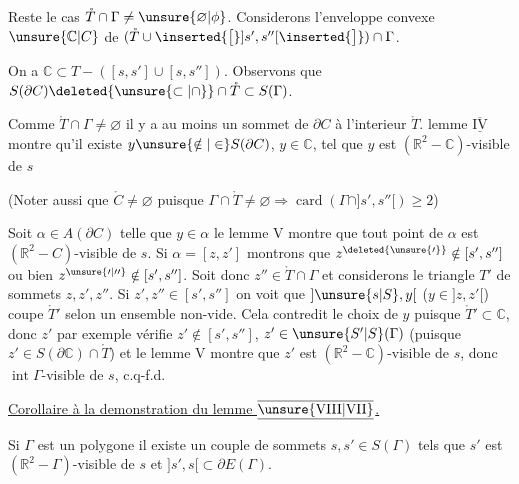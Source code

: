 \margin{!!}Reste le cas $\mathring{T}\cap\Gamma\ne\unsure{\varnothing|\phi}$. Considerons l'enveloppe convexe $\unsure{\mathbb{C}|C}$ de $(\mathring{T}\cup\inserted{\bigl[}]s',s''[\inserted{\bigr]})\cap\Gamma$.

On a $\mathbb{C}\subset T-([s,s']\cup[s,s''])$. Observons que $S(\partial C)\deleted{\unsure{\subset|\cap}}\cap\mathring{T}\subset S(\Gamma)$.

Comme $\mathring{T}\cap\Gamma\ne\varnothing$ il y a au moins un sommet de $\partial C$ à l'interieur $\mathring{T}$.  lemme $\underline{\overline{\mathrm{IV}}}$ montre qu'il existe $y\unsure{\notin|\in}S(\partial C)$, $y\in\mathbb{C}$, tel que $y$ est $(\mathbb{R}^2-\mathbb{C})$-visible de $s$

(Noter aussi que $\mathring{C}\ne\varnothing$ puisque $\Gamma\cap\mathring{T}\ne\varnothing\Rightarrow\operatorname{card}(\Gamma\cap]s',s''[)\geq 2$)

Soit $\alpha\in A(\partial C)$ telle que $y\in\alpha$ le lemme V montre que tout point de $\alpha$ est $(\mathbb{R}^2-C)$-visible de $s$. Si $\alpha=[z,z']$ montrons que $z^{\deleted{\unsure{\prime}}}\notin[s',s'']$ ou bien $z^{\unsure{\prime|\prime\prime}}\notin[s',s'']$. Soit donc $z''\in\mathring{T}\cap\Gamma$ et considerons le triangle $T'$ de sommets $z,z',z''$. Si $z',z''\in[s',s'']$ on voit que $]\unsure{s|S},y[$ ($y\in]z,z'[$) coupe $\mathring{T}'$ selon un ensemble non-vide. Cela contredit le choix de $y$ puisque $\mathring{T}'\subset\mathbb{C}$,  donc $z'$ par exemple vérifie $z'\notin[s',s'']$, $z'\in\unsure{S'|S}(\Gamma)$ (puisque $z'\in S(\partial\mathbb{C})\cap\mathring{T}$) et le lemme  V montre que $z'$ est $(\mathbb{R}^2-\mathbb{C})$-visible de $s$, donc $\operatorname{int}\Gamma$-visible de $s$, c.q-f.d.

\uline{Corollaire à la demonstration du lemme $\underline{\overline{\mathrm{\unsure{VIII|VII}}}}$.} \margin{!!}

Si $\Gamma$ est un polygone il existe un couple de sommets  $s,s'\in S(\Gamma)$ tels que $s'$ est  $(\mathbb{R}^2-\Gamma)$-visible de $s$ et $]s',s[\subset\partial E(\Gamma)$.
